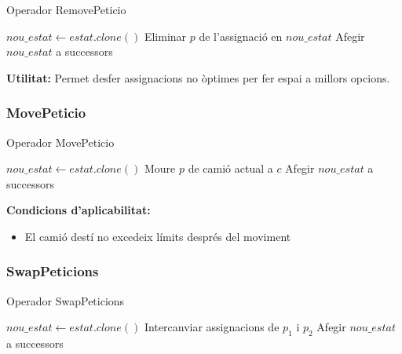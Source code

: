 \begin{algorithm}[H]
\caption{Operador RemovePeticio}
\begin{algorithmic}[1]
    \State $nou\_estat \gets estat.clone()$
    \State Eliminar $p$ de l'assignació en $nou\_estat$
    \State Afegir $nou\_estat$ a successors
\EndFor
\end{algorithmic}
\end{algorithm}

\textbf{Utilitat:}
Permet desfer assignacions no òptimes per fer espai a millors opcions.

\subsubsection{MovePeticio}

\begin{algorithm}[H]
\caption{Operador MovePeticio}
\begin{algorithmic}[1]
            \State $nou\_estat \gets estat.clone()$
            \State Moure $p$ de camió actual a $c$
                \State Afegir $nou\_estat$ a successors
            \EndIf
        \EndIf
    \EndFor
\EndFor
\end{algorithmic}
\end{algorithm}

\textbf{Condicions d'aplicabilitat:}
\begin{itemize}
    \item El camió destí no excedeix límits després del moviment
\end{itemize}

\subsubsection{SwapPeticions}

\begin{algorithm}[H]
\caption{Operador SwapPeticions}
\begin{algorithmic}[1]
    \State $nou\_estat \gets estat.clone()$
    \State Intercanviar assignacions de $p_1$ i $p_2$
        \State Afegir $nou\_estat$ a successors
    \EndIf
\EndFor
\end{algorithmic}
\end{algorithm}

